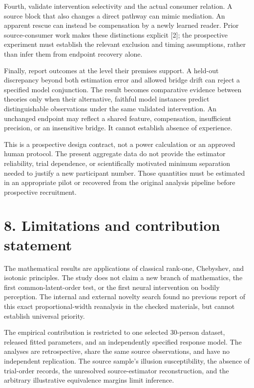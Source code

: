 \documentclass[
  11pt,
]{article}
\let\ctdoldsection\section
\renewcommand{\section}{\Needspace{8\baselineskip}\ctdoldsection}
\begin{document}
Fourth, validate intervention selectivity and the actual consumer
relation. A source block that also changes a direct pathway can mimic
mediation. An apparent rescue can instead be compensation by a newly
learned reader. Prior source-consumer work makes these distinctions
explicit {[}2{]}; the prospective experiment must establish the relevant
exclusion and timing assumptions, rather than infer them from endpoint
recovery alone.

Finally, report outcomes at the level their premises support. A held-out
discrepancy beyond both estimation error and allowed bridge drift can
reject a specified model conjunction. The result becomes comparative
evidence between theories only when their alternative, faithful model
instances predict distinguishable observations under the same validated
intervention. An unchanged endpoint may reflect a shared feature,
compensation, insufficient precision, or an insensitive bridge. It
cannot establish absence of experience.

This is a prospective design contract, not a power calculation or an
approved human protocol. The present aggregate data do not provide the
estimator reliability, trial dependence, or scientifically motivated
minimum separation needed to justify a new participant number. Those
quantities must be estimated in an appropriate pilot or recovered from
the original analysis pipeline before prospective recruitment.

\hypertarget{limitations-and-contribution-statement}{%
\section{8. Limitations and contribution
statement}\label{limitations-and-contribution-statement}}

The mathematical results are applications of classical rank-one,
Chebyshev, and isotonic principles. The study does not claim a new
branch of mathematics, the first common-latent-order test, or the first
neural intervention on bodily perception. The internal and external
novelty search found no previous report of this exact proportional-width
reanalysis in the checked materials, but cannot establish universal
priority.

The empirical contribution is restricted to one selected 30-person
dataset, released fitted parameters, and an independently specified
response model. The analyses are retrospective, share the same source
observations, and have no independent replication. The source sample's
illusion susceptibility, the absence of trial-order records, the
unresolved source-estimator reconstruction, and the arbitrary
illustrative equivalence margins limit inference.
\end{document}
